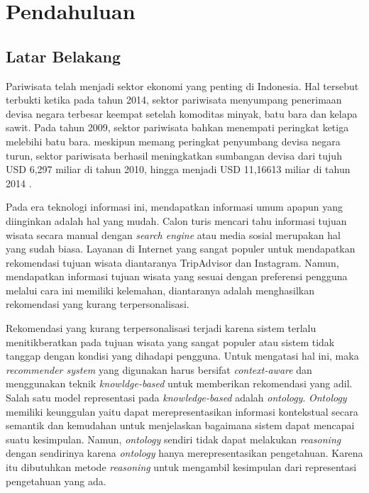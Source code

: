 \chapter{Pendahuluan}
\section{Latar Belakang}

Pariwisata telah menjadi sektor ekonomi yang penting di Indonesia. Hal tersebut terbukti ketika pada tahun 2014, sektor pariwisata menyumpang penerimaan devisa negara terbesar
keempat setelah komoditas minyak, batu bara dan kelapa sawit. Pada tahun 2009, sektor pariwisata bahkan menempati peringkat ketiga melebihi batu bara\cite{bps1}. meskipun memang peringkat penyumbang devisa negara turun, sektor pariwisata berhasil meningkatkan sumbangan devisa dari tujuh USD 6,297 miliar di tahun 2010, hingga menjadi USD 11,16613 miliar di tahun 2014 \cite{bps2}.
\par
Pada era teknologi informasi ini, mendapatkan informasi umum apapun yang diinginkan adalah hal yang mudah. Calon turis mencari tahu informasi tujuan wisata secara manual dengan \textit{search engine} atau media sosial merupakan hal yang sudah biasa. Layanan di Internet yang sangat populer untuk mendapatkan rekomendasi tujuan wisata diantaranya TripAdvisor dan Instagram. Namun, mendapatkan informasi tujuan wisata yang sesuai dengan preferensi pengguna melalui cara ini memiliki kelemahan, diantaranya adalah menghasilkan rekomendasi yang kurang terpersonalisasi.
\par 
Rekomendasi yang kurang terpersonalisasi terjadi karena sistem terlalu menitikberatkan pada tujuan wisata yang sangat populer atau sistem tidak tanggap dengan kondisi yang dihadapi pengguna. Untuk mengatasi hal ini, maka \textit{recommender system} yang digunakan harus bersifat \textit{context-aware}\cite{alhazbi2013} dan menggunakan teknik \textit{knowldge-based} untuk memberikan rekomendasi yang adil. Salah satu model representasi pada \textit{knowledge-based} adalah \textit{ontology}. \textit{Ontology} memiliki keunggulan yaitu dapat merepresentasikan informasi kontekstual secara semantik dan kemudahan untuk menjelaskan bagaimana sistem dapat mencapai suatu kesimpulan. Namun, \textit{ontology} sendiri tidak dapat melakukan \textit{reasoning} dengan sendirinya karena \textit{ontology} hanya merepresentasikan pengetahuan. Karena itu dibutuhkan metode \textit{reasoning} untuk mengambil kesimpulan dari representasi pengetahuan yang ada.
\par
